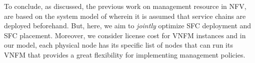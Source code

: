 To conclude, as discussed, the previous work on management resource in NFV, are based on the system model of \cite{AbuLebdeh2017} wherein it is assumed that service chains are deployed beforehand.
But, here, we aim to \textit{jointly} optimize SFC deployment and SFC placement. Moreover, we consider license cost for VNFM instances and in our model,
each physical node has its specific list of nodes that can run its VNFM that provides a great flexibility for implementing management policies.

